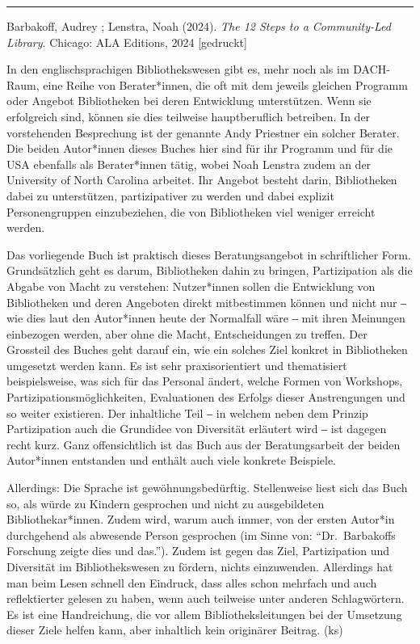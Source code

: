 \documentclass[a4paper,
fontsize=11pt,
oneside,
numbers=noperiodatend,
parskip=half-,
bibliography=totoc,
final
]{scrartcl}
\begin{document}
\begin{center}\rule{0.5\linewidth}{0.5pt}\end{center}

Barbakoff, Audrey ; Lenstra, Noah (2024). \emph{The 12 Steps to a
Community-Led Library}. Chicago: ALA Editions, 2024 {[}gedruckt{]}

In den englischsprachigen Bibliothekswesen gibt es, mehr noch als im
DACH-Raum, eine Reihe von Berater*innen, die oft mit dem jeweils
gleichen Programm oder Angebot Bibliotheken bei deren Entwicklung
unterstützen. Wenn sie erfolgreich sind, können sie dies teilweise
hauptberuflich betreiben. In der vorstehenden Besprechung ist der
genannte Andy Priestner ein solcher Berater. Die beiden Autor*innen
dieses Buches hier sind für ihr Programm und für die USA ebenfalls als
Berater*innen tätig, wobei Noah Lenstra zudem an der University of North
Carolina arbeitet. Ihr Angebot besteht darin, Bibliotheken dabei zu
unterstützen, partizipativer zu werden und dabei explizit
Personengruppen einzubeziehen, die von Bibliotheken viel weniger
erreicht werden.

Das vorliegende Buch ist praktisch dieses Beratungsangebot in
schriftlicher Form. Grundsätzlich geht es darum, Bibliotheken dahin zu
bringen, Partizipation als die Abgabe von Macht zu verstehen:
Nutzer*innen sollen die Entwicklung von Bibliotheken und deren Angeboten
direkt mitbestimmen können und nicht nur ‒ wie dies laut den Autor*innen
heute der Normalfall wäre ‒ mit ihren Meinungen einbezogen werden, aber
ohne die Macht, Entscheidungen zu treffen. Der Grossteil des Buches geht
darauf ein, wie ein solches Ziel konkret in Bibliotheken umgesetzt
werden kann. Es ist sehr praxisorientiert und thematisiert
beispielsweise, was sich für das Personal ändert, welche Formen von
Workshops, Partizipationsmöglichkeiten, Evaluationen des Erfolgs dieser
Anstrengungen und so weiter existieren. Der inhaltliche Teil ‒ in
welchem neben dem Prinzip Partizipation auch die Grundidee von
Diversität erläutert wird ‒ ist dagegen recht kurz. Ganz offensichtlich
ist das Buch aus der Beratungsarbeit der beiden Autor*innen entstanden
und enthält auch viele konkrete Beispiele.

Allerdings: Die Sprache ist gewöhnungsbedürftig. Stellenweise liest sich
das Buch so, als würde zu Kindern gesprochen und nicht zu ausgebildeten
Bibliothekar*innen. Zudem wird, warum auch immer, von der ersten
Autor*in durchgehend als abwesende Person gesprochen (im Sinne von:
\enquote{Dr.~Barbakoffs Forschung zeigte dies und das.}). Zudem ist
gegen das Ziel, Partizipation und Diversität im Bibliothekswesen zu
fördern, nichts einzuwenden. Allerdings hat man beim Lesen schnell den
Eindruck, dass alles schon mehrfach und auch reflektierter gelesen zu
haben, wenn auch teilweise unter anderen Schlagwörtern. Es ist eine
Handreichung, die vor allem Bibliotheksleitungen bei der Umsetzung
dieser Ziele helfen kann, aber inhaltlich kein originärer Beitrag. (ks)
\end{document}
